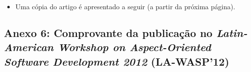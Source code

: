 \begin{figure}[!h]
 \centering
 \label{fig:comprovante_vmil}
\end{figure}

\begin{itemize}
	\item Uma cópia do artigo é apresentado a seguir (a partir da próxima página).
\end{itemize}
\clearpage



\subsection*{Anexo 6: Comprovante da publicação no \emph{Latin-American Workshop on Aspect-Oriented Software Development 2012} (LA-WASP'12)} \label{anexo:comprovante_SBES}

